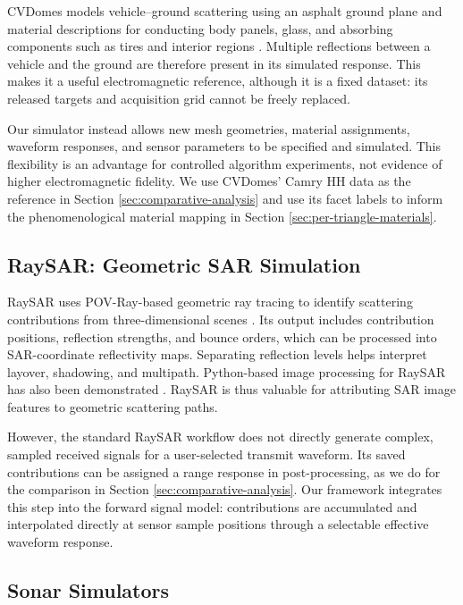 \documentclass[sensors,article,submit,moreauthors]{Definitions/mdpi}
\begin{document}
CVDomes models vehicle--ground scattering using an asphalt ground plane and material descriptions for conducting body panels, glass, and absorbing components such as tires and interior regions \cite{cvdomesreport}. Multiple reflections between a vehicle and the ground are therefore present in its simulated response. This makes it a useful electromagnetic reference, although it is a fixed dataset: its released targets and acquisition grid cannot be freely replaced.

Our simulator instead allows new mesh geometries, material assignments, waveform responses, and sensor parameters to be specified and simulated. This flexibility is an advantage for controlled algorithm experiments, not evidence of higher electromagnetic fidelity. We use CVDomes' Camry HH data as the reference in Section \ref{sec:comparative-analysis} and use its facet labels to inform the phenomenological material mapping in Section \ref{sec:per-triangle-materials}.

\subsection{RaySAR: Geometric SAR Simulation}
\label{sec:raysar}

RaySAR uses POV-Ray-based geometric ray tracing to identify scattering contributions from three-dimensional scenes \cite{raysar,auer2011thesis}. Its output includes contribution positions, reflection strengths, and bounce orders, which can be processed into SAR-coordinate reflectivity maps. Separating reflection levels helps interpret layover, shadowing, and multipath. Python-based image processing for RaySAR has also been demonstrated \cite{raysarpython}. RaySAR is thus valuable for attributing SAR image features to geometric scattering paths.

However, the standard RaySAR workflow does not directly generate complex, sampled received signals for a user-selected transmit waveform. Its saved contributions can be assigned a range response in post-processing, as we do for the comparison in Section \ref{sec:comparative-analysis}. Our framework integrates this step into the forward signal model: contributions are accumulated and interpolated directly at sensor sample positions through a selectable effective waveform response.

\subsection{Sonar Simulators}
\label{sec:sonar-sims}
\end{document}
